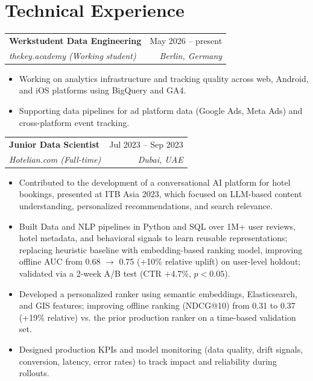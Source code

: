 \documentclass[11pt,a4paper]{article}
\makeatletter
\newcommand{\entry}[4]{%
  \noindent\begin{tabular*}{\textwidth}{@{}l@{\extracolsep{\fill}}r@{}}
    \textbf{#1} & #2 \\
    \textit{#3} & \textit{#4} \\
  \end{tabular*}\vspace{2pt}}
\makeatother
\begin{document}
\section{Technical Experience}

\entry{Werkstudent Data Engineering}{May 2026 -- present}
      {thekey.academy (Working student)}{Berlin, Germany}
\begin{itemize}
  \item Working on analytics infrastructure and tracking quality across web,
        Android, and iOS platforms using BigQuery and GA4.
  \item Supporting data pipelines for ad platform data (Google Ads, Meta Ads)
        and cross-platform event tracking.
\end{itemize}
\vspace{5pt}

\entry{Junior Data Scientist}{Jul 2023 -- Sep 2023}
      {Hotelian.com (Full-time)}{Dubai, UAE}
\begin{itemize}
  \item Contributed to the development of a conversational AI platform for hotel
        bookings, presented at ITB Asia 2023, which focused on LLM-based content
        understanding, personalized recommendations, and search relevance.
  \item Built Data and NLP pipelines in Python and SQL over 1M+ user reviews,
        hotel metadata, and behavioral signals to learn reusable representations;
        replacing heuristic baseline with embedding-based ranking model,
        improving offline AUC from 0.68 $\to$ 0.75 (+10\% relative uplift) on
        user-level holdout; validated via a 2-week A/B test (CTR +4.7\%, $p<0.05$).
  \item Developed a personalized ranker using semantic embeddings, Elasticsearch,
        and GIS features; improving offline ranking (NDCG@10) from 0.31 to 0.37
        (+19\% relative) vs. the prior production ranker on a time-based
        validation set.
  \item Designed production KPIs and model monitoring (data quality, drift
        signals, conversion, latency, error rates) to track impact and
        reliability during rollouts.
\end{itemize}
\vspace{5pt}
\end{document}
